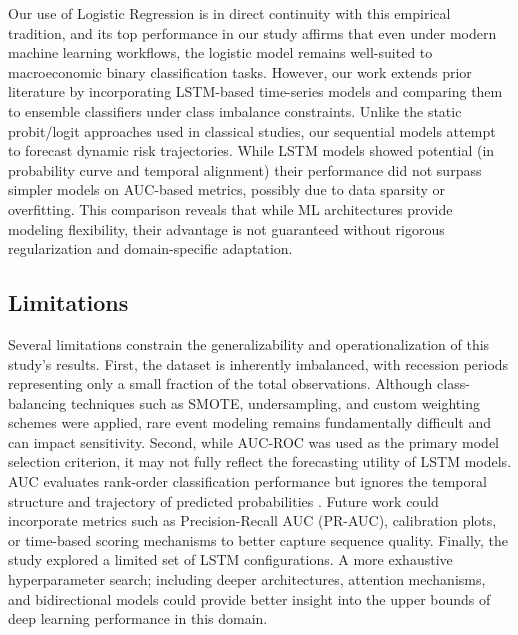 Our use of Logistic Regression is in direct continuity with this empirical tradition, and its top performance in our study affirms that even under modern machine learning workflows, the logistic model remains well-suited to macroeconomic binary classification tasks. However, our work extends prior literature by incorporating LSTM-based time-series models and comparing them to ensemble classifiers under class imbalance constraints. Unlike the static probit/logit approaches used in classical studies, our sequential models attempt to forecast dynamic risk trajectories. While LSTM models showed potential (in probability curve and temporal alignment)
their performance did not surpass simpler models on AUC-based metrics, possibly due to data sparsity or overfitting. This comparison reveals that while ML architectures provide modeling flexibility, their advantage is not guaranteed without rigorous regularization and domain-specific adaptation.


\subsection{Limitations}

Several limitations constrain the generalizability and operationalization of this study’s results. First, the dataset is inherently imbalanced, with recession periods representing only a small fraction of the total observations. Although class-balancing techniques such as SMOTE, undersampling, and custom weighting schemes were applied, rare event modeling remains fundamentally difficult and can impact sensitivity. Second, while AUC‐ROC was used as the primary model selection criterion, it may not fully reflect the forecasting utility of LSTM models. AUC evaluates rank-order classification performance but ignores the temporal structure and trajectory of predicted probabilities%
. Future work could incorporate metrics such as Precision-Recall AUC (PR-AUC), calibration plots, or time-based scoring mechanisms to better capture sequence quality. Finally, the study explored a limited set of LSTM configurations. A more exhaustive hyperparameter search; including deeper architectures, attention mechanisms, and bidirectional models could provide better insight into the upper bounds of deep learning performance in this domain.
